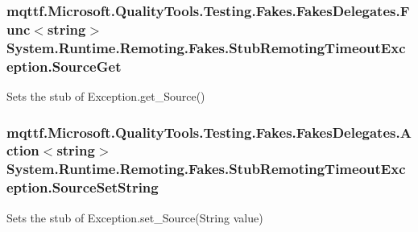 \hypertarget{class_system_1_1_runtime_1_1_remoting_1_1_fakes_1_1_stub_remoting_timeout_exception_ab4a807a32c35fd7b8cfac14ce0cb051e}{
\subsubsection[{Source\-Get}]{\setlength{\rightskip}{0pt plus 5cm}mqttf.\-Microsoft.\-Quality\-Tools.\-Testing.\-Fakes.\-Fakes\-Delegates.\-Func$<$string$>$ System.\-Runtime.\-Remoting.\-Fakes.\-Stub\-Remoting\-Timeout\-Exception.\-Source\-Get}}\label{class_system_1_1_runtime_1_1_remoting_1_1_fakes_1_1_stub_remoting_timeout_exception_ab4a807a32c35fd7b8cfac14ce0cb051e}


Sets the stub of Exception.\-get\-\_\-\-Source()

\hypertarget{class_system_1_1_runtime_1_1_remoting_1_1_fakes_1_1_stub_remoting_timeout_exception_aa63162299f72dc5035ae37f6159b8733}{
\subsubsection[{Source\-Set\-String}]{\setlength{\rightskip}{0pt plus 5cm}mqttf.\-Microsoft.\-Quality\-Tools.\-Testing.\-Fakes.\-Fakes\-Delegates.\-Action$<$string$>$ System.\-Runtime.\-Remoting.\-Fakes.\-Stub\-Remoting\-Timeout\-Exception.\-Source\-Set\-String}}\label{class_system_1_1_runtime_1_1_remoting_1_1_fakes_1_1_stub_remoting_timeout_exception_aa63162299f72dc5035ae37f6159b8733}


Sets the stub of Exception.\-set\-\_\-\-Source(\-String value)

